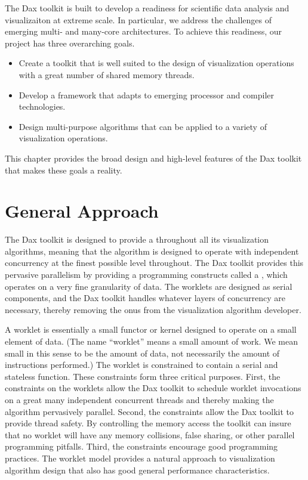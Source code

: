 
The Dax toolkit is built to develop a readiness for scientific data
analysis and visualizaiton at extreme scale. In particular, we address the
challenges of emerging multi- and many-core architectures. To achieve this
readiness, our project has three overarching goals.

\begin{itemize}
\item Create a toolkit that is well suited to the design of visualization
  operations with a great number of shared memory threads.
\item Develop a framework that adapts to emerging processor and compiler
  technologies.
\item Design multi-purpose algorithms that can be applied to a variety of
  visualization operations.
\end{itemize}

This chapter provides the broad design and high-level features of the Dax
toolkit that makes these goals a reality.

\section{General Approach}
\label{sec:GeneralApproach}

The Dax toolkit is designed to provide a 
 throughout all its visualization algorithms,
meaning that the algorithm is designed to operate with independent
concurrency at the finest possible level throughout. The Dax toolkit
provides this pervasive parallelism by providing a programming constructs
called a ,  which operates on a very fine
granularity of data.  The worklets are designed as serial components, and
the Dax toolkit handles whatever layers of concurrency are necessary,
thereby removing the onus from the visualization algorithm developer.

A worklet is essentially a small functor  or kernel
 designed to operate on a small element of data. (The name
``worklet'' means a small amount of work. We mean small in this sense to be
the amount of data, not necessarily the amount of instructions performed.)
The worklet is constrained to contain a serial and stateless
function. These constraints form three critical purposes. First, the
constraints on the worklets allow the Dax toolkit to schedule worklet
invocations on a great many independent concurrent threads and thereby
making the algorithm pervasively parallel. Second, the constraints allow
the Dax toolkit to provide thread safety. By controlling the memory access
the toolkit can insure that no worklet will have any memory collisions,
false sharing, or other parallel programming pitfalls. Third, the
constraints encourage good programming practices. The worklet model
provides a natural approach to visualization algorithm design that also has
good general performance characteristics.

